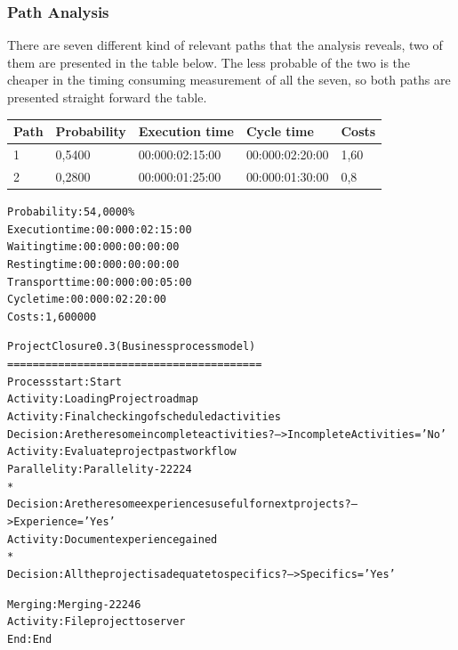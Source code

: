 \subsubsection{Path Analysis}
There are seven different kind of relevant paths that the analysis reveals, two of them are presented in the table below. The less probable of the two is the cheaper in the timing consuming measurement of all the seven, so both paths are presented straight forward the table.

\begin{table}
\centering
\begin{tabular}{|l|l|l|l|l|}
Path&Probability&Execution time&Cycle time&Costs\\
\hline
1&0,5400&00:000:02:15:00&00:000:02:20:00&1,60\\
\hline
2&0,2800&00:000:01:25:00&00:000:01:30:00&0,8
\end{tabular}
\end{table}

\begin{alltt}
Probability:   54,0000\%
Execution time:  00:000:02:15:00
Waiting time:  00:000:00:00:00
Resting time:  00:000:00:00:00
Transport time:  00:000:00:05:00
Cycle time:  00:000:02:20:00
Costs:  1,600000

Project Closure 0.3 (Business process model)
========================================
Process start: Start
Activity: Loading Project roadmap
Activity: Final checking of scheduled activities
Decision: Are there some incomplete activities ? --> IncompleteActivities='No'
Activity: Evaluate project past workflow
Parallelity: Parallelity-22224
    *
    Decision: Are there some experiences useful for next projects? --> Experience='Yes'
    Activity: Document experience gained
    *
    Decision: All the project is adequate to specifics? --> Specifics='Yes'

Merging: Merging-22246
Activity: File project to server
End: End
\end{alltt}

